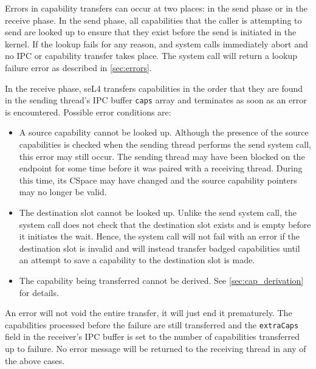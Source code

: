 Errors in capability transfers can occur at two places: in the send
phase or in the receive phase. In the send phase, all capabilities that
the caller is attempting to send are looked up to ensure that they exist
before the send is initiated in the kernel. If the lookup fails for any
reason,  and  system calls immediately abort and
no IPC or capability transfer takes place. The system call will return
a lookup failure error as described in \autoref{sec:errors}.

In the receive phase, seL4 transfers capabilities in the order that they
are found in the sending thread's IPC buffer \texttt{caps} array
and terminates as soon as an error is encountered. Possible error
conditions are:

\begin{itemize}
    \item A source capability cannot be looked up. Although the presence
    of the source capabilities is checked when the sending thread
    performs the send system call, this error may still occur. The sending
    thread may have been blocked on the endpoint for some time before it
    was paired with a receiving thread. During this time, its
    CSpace may have changed and the source capability pointers may
    no longer be valid.

    \item The destination slot cannot be looked up. Unlike the send
    system call, the  system call does not check that the
    destination slot exists and is empty before it initiates the wait.
    Hence, the  system call will not fail with an error if the
    destination slot is invalid and will instead transfer badged
    capabilities until an attempt to save a capability to the
    destination slot is made.

    \item The capability being transferred cannot be derived. See
    \autoref{sec:cap_derivation} for details.
\end{itemize}

An error will not void the entire transfer, it will just end it
prematurely. The capabilities processed before the failure are still
transferred and the \texttt{extraCaps} field in the receiver's IPC
buffer is set to the number of capabilities transferred up to failure.
No error message will be returned to the receiving thread in any of the
above cases.
